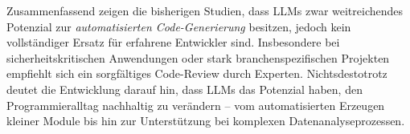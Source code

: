 \documentclass[11pt,a4paper]{article}
\begin{document}
Zusammenfassend zeigen die bisherigen Studien, dass LLMs zwar weitreichendes Potenzial zur \emph{automatisierten Code-Generierung} besitzen, jedoch kein vollständiger Ersatz für erfahrene Entwickler sind. Insbesondere bei sicherheitskritischen Anwendungen oder stark branchenspezifischen Projekten empfiehlt sich ein sorgfältiges Code-Review durch Experten. Nichtsdestotrotz deutet die Entwicklung darauf hin, dass LLMs das Potenzial haben, den Programmieralltag nachhaltig zu verändern – vom automatisierten Erzeugen kleiner Module bis hin zur Unterstützung bei komplexen Datenanalyseprozessen.

\newpage


\printbibliography
\end{document}
